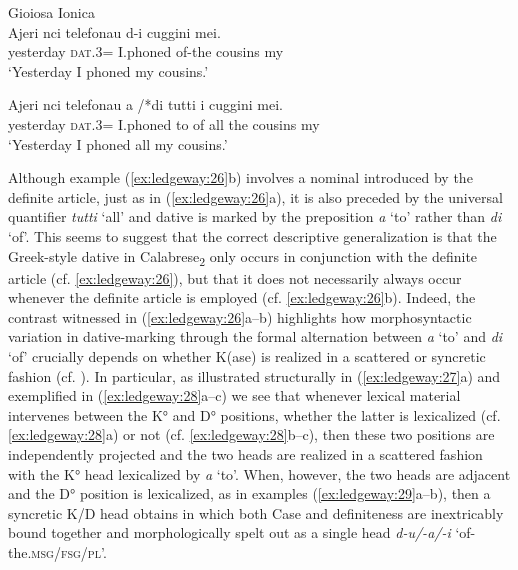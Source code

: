 \documentclass[output=paper,modfonts,nonflat,colorlinks,citecolor=brown]{langsci/langscibook}
\begin{document}
\ea\label{ex:ledgeway:26}
  Gioiosa Ionica\\
\ea
	\gll Ajeri  nci  telefonau  d-i     cuggini   mei.\\
      yesterday  \textsc{dat}.3=  I.phoned  of-the  cousins   my\\
      \glt `Yesterday I phoned my cousins.'

\ex
	\gll Ajeri  nci  telefonau  a /*di  tutti   i     cuggini   mei.\\
      yesterday  \textsc{dat}.3=  I.phoned  to   of  all   the   cousins   my\\
      \glt `Yesterday I phoned all my cousins.'
      \z
      \z

Although example (\ref{ex:ledgeway:26}b) involves a nominal introduced by the definite article, just as in (\ref{ex:ledgeway:26}a), it is also preceded by the universal quantifier \textit{tutti} ‘all’ and dative is marked by the preposition \textit{a} ‘to’ rather than \textit{di} ‘of’. This seems to suggest that the correct descriptive generalization is that the Greek-style dative in Calabrese\textsubscript{2} only occurs in conjunction with the definite article (cf. \ref{ex:ledgeway:26}), but that it does not necessarily always occur whenever the definite article is employed (cf. \ref{ex:ledgeway:26}b). Indeed, the contrast witnessed in (\ref{ex:ledgeway:26}a--b) highlights how morphosyntactic variation in dative-marking through the formal alternation between \textit{a} ‘to’ and \textit{di} ‘of’ crucially depends on whether K(ase) is realized in a scattered or syncretic fashion (cf. \citealt{GiorgiPianesi1997}). In particular, as illustrated structurally in (\ref{ex:ledgeway:27}a) and exemplified in (\ref{ex:ledgeway:28}a--c) we see that whenever lexical material intervenes between the K° and D° positions, whether the latter is lexicalized (cf. \ref{ex:ledgeway:28}a) or not (cf. \ref{ex:ledgeway:28}b--c), then these two positions are independently projected and the two heads are realized in a scattered fashion with the K° head lexicalized by \textit{a} ‘to’. When, however, the two heads are adjacent and the D° position is lexicalized, as in examples (\ref{ex:ledgeway:29}a--b), then a syncretic K/D head obtains in which both Case and definiteness are inextricably bound together and morphologically spelt out as a single head \textit{d-u/-a/-i} ‘of-the.\textsc{msg/fsg/pl}’.
\end{document}
